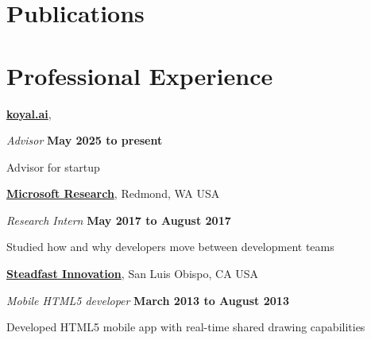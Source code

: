 \documentclass[10pt]{article}
\begin{document}
\section{Publications}

\begin{publications}
\end{publications}








\section{Professional Experience}


\href{https://koyal.ai/}{\textbf{koyal.ai}},
\begin{outerlist}
\item[] \textit{Advisor}%
    \hfill \textbf{May 2025 to present}%
    \begin{innerlist}
    \item Advisor for startup
    \end{innerlist}
\end{outerlist}

\href{https://www.microsoft.com/en-us/research/}{\textbf{Microsoft Research}},
Redmond, WA USA
\begin{outerlist}
\item[] \textit{Research Intern}%
    \hfill \textbf{May 2017 to August 2017}%
    \begin{innerlist}
    \item Studied how and why developers move between development teams 
    \end{innerlist}
\end{outerlist}

\halfblankline


\href{http://steadfastinnovation.com/}{\textbf{Steadfast Innovation}},
San Luis Obispo, CA USA
\begin{outerlist}
\item[] \textit{Mobile HTML5 developer}%
    \hfill \textbf{March 2013 to August 2013}%
    \begin{innerlist}
    \item Developed HTML5 mobile app with real-time shared drawing capabilities 
    \end{innerlist}
\end{outerlist}
\end{document}
